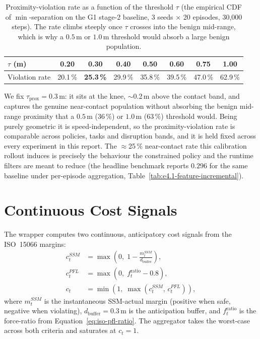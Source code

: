 \documentclass[11pt,a4paper]{report}
\newcommand{\ssm}{SSM}
\newcommand{\pfl}{PFL}
\newcommand{\iso}{ISO~15066}
\begin{document}
\begin{table}[htbp]
\centering
\small
\caption{Proximity-violation rate as a function of the threshold
$\tau$ (the empirical CDF of $\min$-separation on the G1 stage-2
baseline, 3 seeds $\times$ 20 episodes, 30{,}000 steps). The rate
climbs steeply once $\tau$ crosses into the benign mid-range, which is
why a $0.5$\,m or $1.0$\,m threshold would absorb a large benign
population.}
\label{tab:prox-calib}
\begin{tabular}{lccccccc}
\toprule
$\tau$ (m) & 0.20 & \textbf{0.30} & 0.40 & 0.50 & 0.60 & 0.75 & 1.00 \\
\midrule
Violation rate & 20.1\,\% & \textbf{25.3\,\%} & 29.9\,\% & 35.8\,\% & 39.5\,\% & 47.0\,\% & 62.9\,\% \\
\bottomrule
\end{tabular}
\end{table}

We fix $\tau_{\mathrm{prox}} = 0.3$\,m: it sits at the knee, $\sim$0.2\,m
above the contact band, and captures the genuine near-contact
population without absorbing the benign mid-range proximity that a
$0.5$\,m ($36\,\%$) or $1.0$\,m ($63\,\%$) threshold would. Being
purely geometric it is speed-independent, so the proximity-violation
rate is comparable across policies, tasks and disruption bands, and
it is held fixed across every experiment in this report. The
$\approx$25\,\% near-contact rate this calibration rollout induces
is precisely the behaviour the constrained policy and the runtime
filters are meant to reduce (the headline benchmark reports $0.296$
for the same baseline under per-episode aggregation,
Table~\ref{tab:e4.1-feature-incremental}).

\section{Continuous Cost Signals}
\label{sec:bench:cost}

The wrapper computes two continuous, anticipatory cost signals from
the \iso{} margins:
\begin{align}
  c^{\ssm}_t  &= \max\!\left(0,\; 1 - \frac{m^{\ssm}_t}{d_{\mathrm{buffer}}}\right),
    \label{eq:c-ssm} \\
  c^{\pfl}_t  &= \max\!\left(0,\; f^{\mathrm{ratio}}_t - 0.8\right),
    \label{eq:c-pfl} \\
  c_t         &= \min\!\left(1,\; \max(c^{\ssm}_t,\, c^{\pfl}_t)\right),
    \label{eq:c-total}
\end{align}
where $m^{\ssm}_t$ is the instantaneous \ssm{}-actual margin
(positive when safe, negative when violating), $d_{\mathrm{buffer}}
= 0.3$\,m is the anticipation buffer, and $f^{\mathrm{ratio}}_t$ is
the force-ratio from Equation~\ref{eq:iso-pfl-ratio}. The
aggregator takes the worst-case across both criteria and saturates
at $c_t = 1$.
\end{document}
